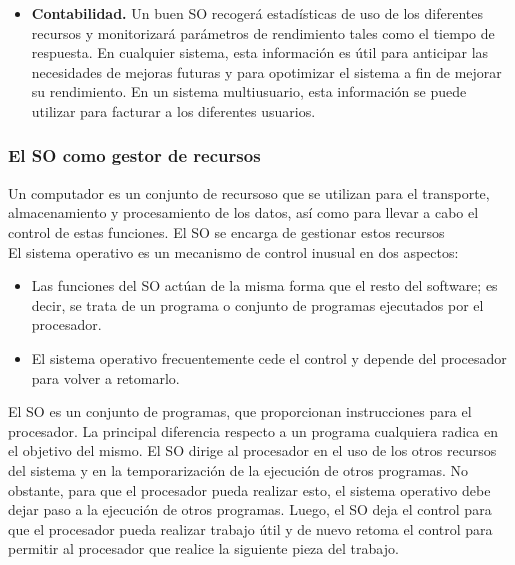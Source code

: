 \documentclass{article}
\begin{document}
\begin{itemize}
					\item \textbf{Contabilidad.} Un buen SO recogerá estadísticas de uso de los diferentes recursos y monitorizará parámetros de rendimiento tales como el tiempo de respuesta. En cualquier sistema, esta información es útil para anticipar las necesidades de mejoras futuras y para opotimizar el sistema a fin de mejorar su rendimiento. En un sistema multiusuario, esta información se puede utilizar para facturar a los diferentes usuarios.
				
					\end{itemize}
		
				\subsubsection{El SO como gestor de recursos}							
					Un computador es un conjunto de recursoso que se utilizan para el transporte, almacenamiento y procesamiento de los datos, así como para llevar a cabo el control de estas funciones. El SO se encarga de gestionar estos recursos \\
					
					El sistema operativo es un mecanismo de control inusual en dos aspectos:
						\begin{itemize}
						\item Las funciones del SO actúan de la misma forma que el resto del software; es decir, se trata de un programa o conjunto de programas ejecutados por el procesador.
						
						\item El sistema operativo frecuentemente cede el control y depende del procesador para volver a retomarlo.
						
						\end{itemize}		
						
					
					El SO es un conjunto de programas, que proporcionan instrucciones para el procesador. La principal diferencia respecto a un programa cualquiera radica en el objetivo del mismo. El SO dirige al procesador en el uso de los otros recursos del sistema y en la temporarización de la ejecución de otros programas. No obstante, para que el procesador pueda realizar esto, el sistema operativo debe dejar paso a la ejecución de otros programas. Luego, el SO deja el control para que el procesador pueda realizar trabajo útil y de nuevo retoma el control para permitir al procesador que realice la siguiente pieza del trabajo. \\
					
\end{document}
